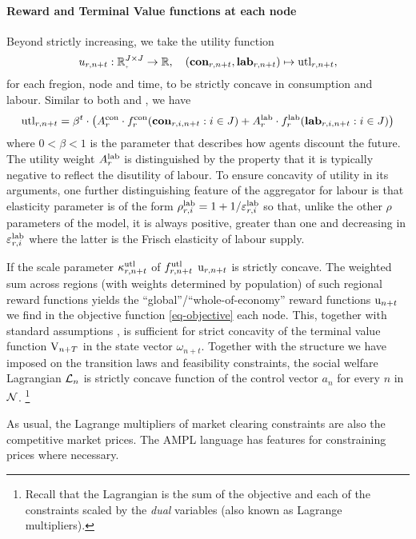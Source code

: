 \documentclass[12pt,a4paper,twoside, draft]{article}
\begin{document}
\paragraph{Reward and Terminal Value functions at each node}
Beyond strictly increasing, we take the utility function
\[
u_{r, n + t}: \nnreal^{J \times J} \rightarrow \R, \quad
  (\mathbf{con}_{r, n + t}, \mathbf{lab}_{r, n + t})
    \mapsto \textup{utl}_{r, n + t},
\]
for each fregion, node and time,
to be strictly concave in consumption and labour.
Similar to both \citet{Atalay-Sectoral_shocks} and \citet{CJ}, we have
\begin{equation}
  \textup{utl}_{r, n + t}
    = \beta^{t}
      \cdot \left(
        A_{r}^\textup{con}
          \cdot f_{r}^{\textup{con}}(\mathbf{con}_{r, i, n + t}: i \in J)
        + A_{r}^\textup{lab}
          \cdot f_{r}^{\textup{lab}}(\mathbf{lab}_{r, i, n + t}: i \in J)
      \right)
\end{equation}
where $0 < \beta < 1$ is the parameter that describes how agents discount
the future.
The utility weight $A_{r}^{\textup{lab}}$ is distinguished by the property that
it is typically negative to reflect the disutility of labour.
To ensure concavity of utility in its arguments, one further distinguishing
feature of the aggregator for labour is that elasticity parameter is of the
form
$\rho_{r, i}^{\textup{lab}} = 1 + 1 / \varepsilon_{r, i}^{\textup{lab}}$
so that, unlike the other $\rho$ parameters of the model, it is always
positive, greater than one and decreasing in $\varepsilon_{r, i}^\textup{lab}$
where the latter is the Frisch elasticity of labour supply.

If the scale parameter $\kappa_{r, n + t}^\textup{utl}$ of 
$f_{r, n + t}^\textup{utl}$ $\textup{u}_{r, n + t}$ is strictly concave.
The weighted sum across regions (with weights determined by population) of such
regional reward functions yields the ``global''/``whole-of-economy'' reward
functions $\textup{u}_{n + t}$ we find in the objective function
\eqref{eq-objective} each node.
This, together with standard assumptions
\citep[Theorem 12.2.12]{Stachurski-Economic_dynamics}, is sufficient for strict
concavity of the terminal value function $\textup{V}_{n + T}$ in the state
vector $\omega_{n + t}$.
Together with the structure we have imposed on the transition laws and
feasibility constraints, the social welfare Lagrangian $\mathcal L_{n}$ is
strictly concave function of the control vector $a_{n}$ for every $n$ in
$\mathcal N$.
\footnote{
Recall that the Lagrangian is the sum of the objective and each of the
constraints scaled by the \emph{dual} variables (also known as Lagrange
multipliers).
}
\begin{remark*}
As usual, the Lagrange multipliers of market clearing constraints are also the
competitive market prices.
The AMPL language has features for constraining prices where necessary.
\end{remark*}
\end{document}
